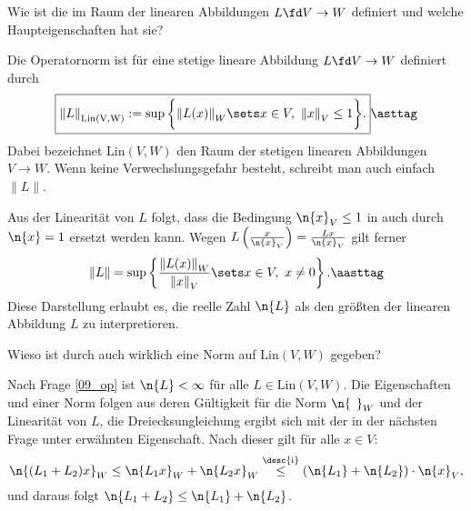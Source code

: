 \begin{frage}\label{09_oper}
  Wie ist die  im Raum der  
  linearen Abbildungen $L \fd V \to W$ definiert und welche Haupteigenschaften hat sie?
\end{frage}

\begin{antwort}
  Die Operatornorm ist für eine stetige lineare Abbildung 
  $L \fd V \to W$ definiert durch
  \begin{equation}
    \boxed{
      {\| L \|}_{\mathrm{Lin(V,W)}} := 
      \sup \bigg\{ {\| L (x) \|}_W \sets x \in V, \,\, {\| x \|}_V \le 1 \bigg\}.}
    \asttag
  \end{equation}
  Dabei bezeichnet $\mathrm{Lin}(V,W)$ 
  den Raum der stetigen linearen Abbildungen $V\to W$. 
  Wenn keine Verwechslungsgefahr besteht, schreibt man auch 
  einfach ${\| L \|}$. 

  Aus der Linearität von $L$ folgt, dass die Bedingung $\n{ x }_V \le 1$ in 
  {\astref} auch durch $\n{ x }=1$ ersetzt werden kann. Wegen 
  $L\left( \frac{x}{ \n{x}_V } \right) = \frac{Lx}{ \n{x}_V }$ gilt ferner 
  \begin{equation}
    {\|} L {\|} = \sup\left\{  
      \frac{ {\| L(x) \|}_W }{ {\| x \|}_V } \sets x\in V,\,\, x\not=0
    \right\}.
    \aasttag
  \end{equation}
  Diese Darstellung erlaubt es, 
  die reelle Zahl $\n{L}$ als den größten 
   der linearen Abbildung $L$ zu interpretieren. 
  \AntEnd
\end{antwort} 

\begin{frage}
  Wieso ist durch {\astref} auch wirklich eine 
  Norm auf $\mathrm{Lin}(V,W)$ gegeben?
\end{frage}

\begin{antwort} 
  Nach Frage \ref{09_op} ist $\n{L} < \infty$ für alle 
  $L\in\mathrm{Lin}(V,W)$.  
  Die Eigenschaften  und  einer 
  Norm folgen aus deren Gültigkeit 
  für die Norm $\n{\;\,}_W$ und der Linearität von $L$, 
  die Dreiecksungleichung ergibt sich mit der in der nächsten 
  Frage unter  erwähnten Eigenschaft. 
  Nach dieser gilt für alle $x\in V$: 
  \[
  \n{ (L_1+L_2) x }_W \le \n{ L_1 x }_W+ \n{ L_2x }_W  
  \stackrel{\text{\desc{i}}}{\le} 
  ( \n{L_1} + \n{L_2} ) \cdot \n{x}_V,
  \]
  und daraus folgt $\n{ L_1 + L_2 } \le \n{L_1}+ \n{L_2}$.\AntEnd
\end{antwort}  

